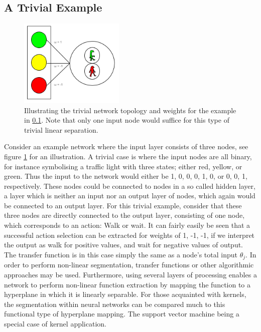 \subsection{A Trivial Example}\label{trivial_example}

\begin{figure}
\centering
\includegraphics[width=5cm]{fig/trivial_example}
\caption{Illustrating the trivial network topology and weights for the example in \ref{trivial_example}. Note that only one input node would suffice for this type of trivial linear separation.}
\label{fig:trivial_example}
\end{figure}

Consider an example network where the input layer consists of three nodes, see figure \ref{fig:trivial_example} for an illustration. A trivial case is where the input nodes are all binary, for instance symbolising a traffic light with three states; either red, yellow, or green. Thus the input to the network would either be {1, 0, 0}, {0, 1, 0}, or {0, 0, 1}, respectively. These nodes could be connected to nodes in a so called hidden layer, a layer which is neither an input nor an output layer of nodes, which again would be connected to an output layer. For this trivial example, consider that these three nodes are directly connected to the output layer, consisting of one node, which corresponds to an action: Walk or wait. It can fairly easily be seen that a successful action selection can be extracted for weights of {1, -1, -1}, if we interpret the output as walk for positive values, and wait for negative values of output. The transfer function is in this case simply the same as a node's total input $\theta_j$. In order to perform non-linear segmentation, transfer functions or other algorithmic approaches may be used. Furthermore, using several layers of processing enables a network to perform non-linear function extraction by mapping the function to a hyperplane in which it is linearly separable. For those acquainted with kernels, the segmentation within neural networks can be compared much to this functional type of hyperplane mapping. The support vector machine being a special case of kernel application.


